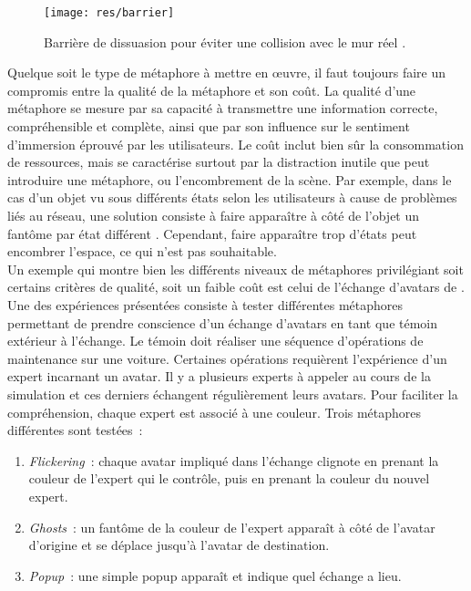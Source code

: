 \documentclass[11pt]{article}
\begin{document}
\begin{figure}
\centering
\texttt{[image: res/barrier]}
\caption{\label{fig:barrier}Barrière de dissuasion pour éviter une collision avec le mur réel \cite{survey}.}
\end{figure}

Quelque soit le type de métaphore à mettre en œuvre, il faut toujours faire un compromis entre la qualité de la métaphore et son coût. La qualité d'une métaphore se mesure par sa capacité à transmettre une information correcte, compréhensible et complète, ainsi que par son influence sur le sentiment d'immersion éprouvé par les utilisateurs. Le coût inclut bien sûr la consommation de ressources, mais se caractérise surtout par la distraction inutile que peut introduire une métaphore, ou l'encombrement de la scène. Par exemple, dans le cas d'un objet vu sous différents états selon les utilisateurs à cause de problèmes liés au réseau, une solution consiste à faire apparaître à côté de l'objet un fantôme par état différent \cite{network-errors}. Cependant, faire apparaître trop d'états peut encombrer l'espace, ce qui n'est pas souhaitable.
\\

Un exemple qui montre bien les différents niveaux de métaphores privilégiant soit certains critères de qualité, soit un faible coût est celui de l'échange d'avatars de \cite{avatars}. Une des expériences présentées consiste à tester différentes métaphores permettant de prendre conscience d'un échange d'avatars en tant que témoin extérieur à l'échange. Le témoin doit réaliser une séquence d'opérations de maintenance sur une voiture. Certaines opérations requièrent l'expérience d'un expert incarnant un avatar. Il y a plusieurs experts à appeler au cours de la simulation et ces derniers échangent régulièrement leurs avatars. Pour faciliter la compréhension, chaque expert est associé à une couleur. Trois métaphores différentes sont testées~:
\begin{enumerate}
	\item \textit{Flickering}~: chaque avatar impliqué dans l'échange clignote en prenant la couleur de l'expert qui le contrôle, puis en prenant la couleur du nouvel expert.
	\item \textit{Ghosts}~: un fantôme de la couleur de l'expert apparaît à côté de l'avatar d'origine et se déplace jusqu'à l'avatar de destination.
	\item \textit{Popup}~: une simple popup apparaît et indique quel échange a lieu.
\end{enumerate}
\end{document}
